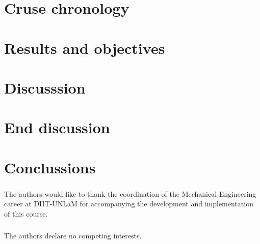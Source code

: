 \documentclass[runningheads]{llncs}
\begin{document}


\section{Cruse chronology}



\section{Results and objectives}



\section{Discusssion}



\section{End discussion}



\section{Conclussions}



\begin{credits}
\subsubsection{\ackname} 
The authors would like to thank the coordination of the Mechanical Engineering career at DIIT-UNLaM for accompanying the development and implementation of this course. 


\subsubsection{\discintname}
The authors declare no competing interests.
\end{credits}

\printbibliography[title= Bibliography, heading=bibintoc]
%
%
%
% 
% 
%

\end{document}
